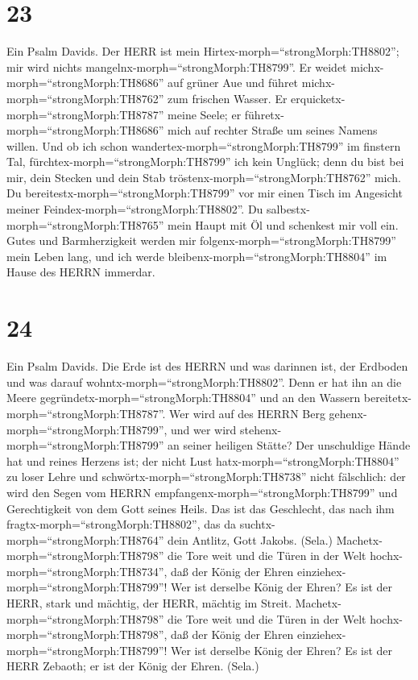 \hypertarget{section-22}{%
\section{23}\label{section-22}}

 Ein Psalm Davids. Der HERR ist mein
Hirtex-morph=``strongMorph:TH8802''; mir wird nichts
mangelnx-morph=``strongMorph:TH8799''.  Er weidet
michx-morph=``strongMorph:TH8686'' auf grüner Aue und führet
michx-morph=``strongMorph:TH8762'' zum frischen Wasser.  Er
erquicketx-morph=``strongMorph:TH8787'' meine Seele; er
führetx-morph=``strongMorph:TH8686'' mich auf rechter Straße um seines
Namens willen.  Und ob ich schon
wandertex-morph=``strongMorph:TH8799'' im finstern Tal,
fürchtex-morph=``strongMorph:TH8799'' ich kein Unglück; denn du bist bei
mir, dein Stecken und dein Stab tröstenx-morph=``strongMorph:TH8762''
mich.  Du bereitestx-morph=``strongMorph:TH8799'' vor mir
einen Tisch im Angesicht meiner Feindex-morph=``strongMorph:TH8802''. Du
salbestx-morph=``strongMorph:TH8765'' mein Haupt mit Öl und schenkest
mir voll ein.  Gutes und Barmherzigkeit werden mir
folgenx-morph=``strongMorph:TH8799'' mein Leben lang, und ich werde
bleibenx-morph=``strongMorph:TH8804'' im Hause des HERRN immerdar.

\hypertarget{section-23}{%
\section{24}\label{section-23}}

 Ein Psalm Davids. Die Erde ist des HERRN und was darinnen
ist, der Erdboden und was darauf wohntx-morph=``strongMorph:TH8802''.
 Denn er hat ihn an die Meere
gegründetx-morph=``strongMorph:TH8804'' und an den Wassern
bereitetx-morph=``strongMorph:TH8787''.  Wer wird auf des
HERRN Berg gehenx-morph=``strongMorph:TH8799'', und wer wird
stehenx-morph=``strongMorph:TH8799'' an seiner heiligen Stätte?
 Der unschuldige Hände hat und reines Herzens ist; der nicht
Lust hatx-morph=``strongMorph:TH8804'' zu loser Lehre und
schwörtx-morph=``strongMorph:TH8738'' nicht fälschlich:  der
wird den Segen vom HERRN empfangenx-morph=``strongMorph:TH8799'' und
Gerechtigkeit von dem Gott seines Heils.  Das ist das
Geschlecht, das nach ihm fragtx-morph=``strongMorph:TH8802'', das da
suchtx-morph=``strongMorph:TH8764'' dein Antlitz, Gott Jakobs. (Sela.)
 Machetx-morph=``strongMorph:TH8798'' die Tore weit und die
Türen in der Welt hochx-morph=``strongMorph:TH8734'', daß der König der
Ehren einziehex-morph=``strongMorph:TH8799''!  Wer ist
derselbe König der Ehren? Es ist der HERR, stark und mächtig, der HERR,
mächtig im Streit.  Machetx-morph=``strongMorph:TH8798'' die
Tore weit und die Türen in der Welt hochx-morph=``strongMorph:TH8798'',
daß der König der Ehren einziehex-morph=``strongMorph:TH8799''!
 Wer ist derselbe König der Ehren? Es ist der HERR Zebaoth;
er ist der König der Ehren. (Sela.)

